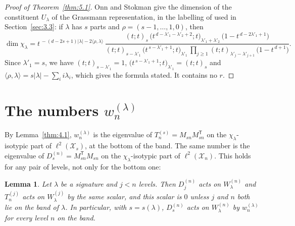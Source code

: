 \documentclass[11pt]{article}
\numberwithin{equation}{section}
\theoremstyle{plain}
\newtheorem{lemma}[theorem]{Lemma}
\theoremstyle{definition}
\begin{document}
\begin{proof}[Proof of Theorem~\ref{thm:5.1}]
Onn and Stokman \cite[Thm. 4.5, (4.13)]{OS06} give the dimension of the constituent
$U_\lambda$ of the Grassmann representation, in the labelling of \cite{BO12} used in
Section~\ref{sec:3.3}: if $\lambda$ has $s$ parts and $\rho=(s-1,\dots,1,0)$, then
\[
\dim\chi_\lambda=t^{\,-(d-2s+1)|\lambda|-2\langle\rho,\lambda\rangle}\,
\frac{(t;t)_s\,\bigl(t^{\,d-\lambda'_1-\lambda'_2+2};t\bigr)_{\lambda'_1+\lambda'_2}\,\bigl(1-t^{\,d-2\lambda'_1+1}\bigr)}
{(t;t)_{s-\lambda'_1}\,\bigl(t^{\,s-\lambda'_1+1};t\bigr)_{\lambda'_1}\,\prod_{j\ge1}(t;t)_{\lambda'_j-\lambda'_{j+1}}\,\bigl(1-t^{\,d+1}\bigr)} .
\]
Since $\lambda'_1=s$, we have $(t;t)_{s-\lambda'_1}=1$, $\bigl(t^{\,s-\lambda'_1+1};t\bigr)_{\lambda'_1}=(t;t)_s$
and $\langle\rho,\lambda\rangle=s|\lambda|-\sum_ii\lambda_i$, which gives the formula stated. It contains no $r$.
\end{proof}

\section{\texorpdfstring{The numbers $w^{(\lambda)}_n$}{The numbers w(lambda,n)}}\label{sec:w}

By Lemma~\ref{thm:4.1}, $w^{(\lambda)}_n$ is the eigenvalue of
$T^{(s)}_n=M_{sn}M_{sn}^{\mathsf T}$ on the $\chi_\lambda$-isotypic part of
$\ell^2(\mathcal{X}_{s})$, at the bottom of the band. The same number is the eigenvalue of
$D^{(n)}_{s}=M_{sn}^{\mathsf T}M_{sn}$ on the $\chi_\lambda$-isotypic part of
$\ell^2(\mathcal{X}_n)$. This holds for any pair of levels, not only for the bottom one:

\begin{lemma}\label{thm:w-down}
Let $\lambda$ be a signature and $j<n$ levels. Then $D^{(n)}_{j}$ acts on
$W^{(n)}_\lambda$ and $T^{(j)}_n$ acts on $W^{(j)}_\lambda$ by the same scalar, and this
scalar is $0$ unless $j$ and $n$ both lie on the band of $\lambda$. In particular, with
$s=s(\lambda)$, $D^{(n)}_{s}$ acts on $W^{(n)}_\lambda$ by $w^{(\lambda)}_n$ for every level
$n$ on the band.
\end{lemma}
\end{document}
